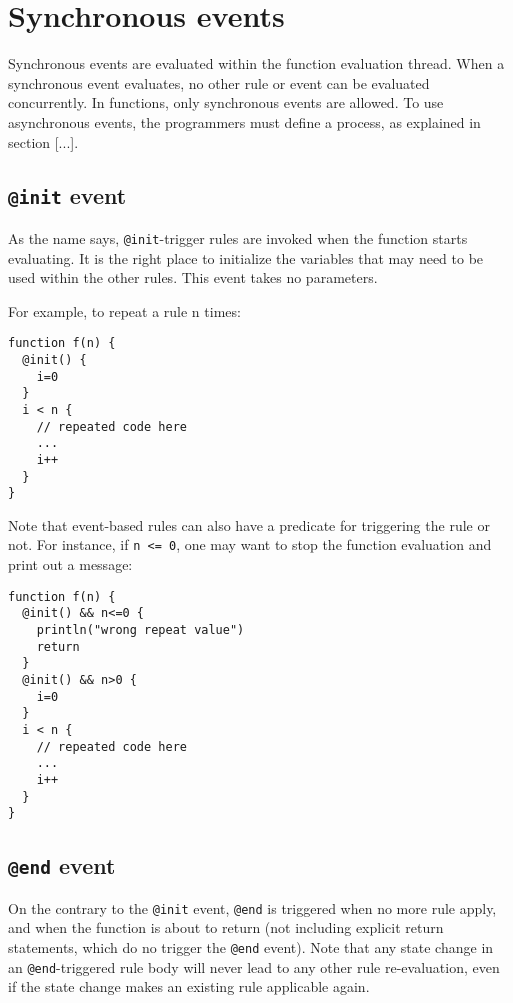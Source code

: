 \documentclass[11pt]{report}
\begin{document}
\section{Synchronous events}

Synchronous events are evaluated within the function evaluation thread. When a synchronous event evaluates, no other rule or event can be evaluated concurrently. In functions, only synchronous events are allowed. To use asynchronous events, the programmers must define a process, as explained in section [...].

\subsection{\texttt{@init} event}

As the name says, \texttt{@init}-trigger rules are invoked when the function starts evaluating. It is the right place to initialize the variables that may need to be used within the other rules. This event takes no parameters.

For example, to repeat a rule n times:

\begin{lstlisting}
function f(n) {
  @init() {
    i=0
  }
  i < n {
    // repeated code here
    ...
    i++
  }
}
\end{lstlisting}

Note that event-based rules can also have a predicate for triggering the rule or not. For instance, if \texttt{n <= 0}, one may want to stop the function evaluation and print out a message:

\begin{lstlisting}
function f(n) {
  @init() && n<=0 {
    println("wrong repeat value")
    return
  }
  @init() && n>0 {
    i=0
  }
  i < n {
    // repeated code here
    ...
    i++
  }
}
\end{lstlisting}

\subsection{\texttt{@end} event}

On the contrary to the \texttt{@init} event, \texttt{@end} is triggered when no more rule apply, and when the function is about to return (not including explicit return statements, which do no trigger the \texttt{@end} event). Note that any state change in an \texttt{@end}-triggered rule body will never lead to any other rule re-evaluation, even if the state change makes an existing rule applicable again.
\end{document}
